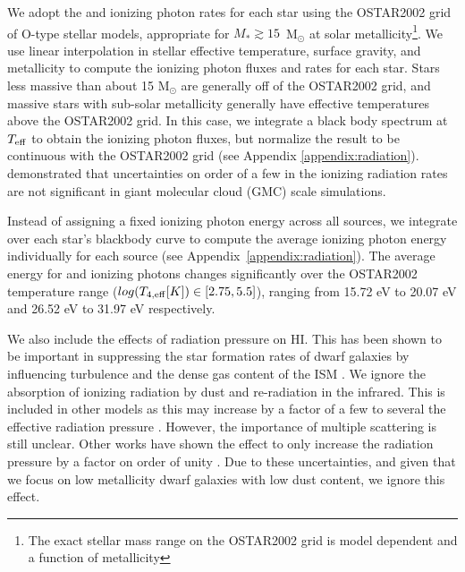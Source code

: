 \documentclass[twocolumn]{aastex61}
\begin{document}
We adopt the  and  ionizing photon rates for each star using the OSTAR2002 \citep{Lanz2003} grid of O-type stellar models, appropriate for $M_{*} \gtrsim 15$~M$_{\odot}$ at solar metallicity\footnote{The exact stellar mass range on the OSTAR2002 grid is model dependent and a function of metallicity}. We use linear interpolation in stellar effective temperature, surface gravity, and metallicity to compute the ionizing photon fluxes and rates for each star. Stars less massive than about 15 M$_{\odot}$ are generally off of the OSTAR2002 grid, and massive stars with sub-solar metallicity generally have effective temperatures above the OSTAR2002 grid. In this case, we integrate a black body spectrum at $T_{\rm eff}$ to obtain the ionizing photon fluxes, but normalize the result to be continuous with the OSTAR2002 grid (see Appendix \ref{appendix:radiation}). \citep{Dale2012} demonstrated that uncertainties on order of a few in the ionizing radiation rates are not significant in giant molecular cloud (GMC) scale simulations.

Instead of assigning a fixed ionizing photon energy across all sources, we integrate over each star's blackbody curve to compute the average ionizing photon energy individually for each source (see Appendix~\ref{appendix:radiation}). The average energy for  and  ionizing photons changes significantly over the OSTAR2002 temperature range ($log(T_{4,\rm{eff}} [K]) \in \left[2.75,5.5\right]$), ranging from 15.72 eV to 20.07 eV and 26.52 eV to 31.97 eV respectively.

We also include the effects of radiation pressure on HI. This has been shown to be important in suppressing the star formation rates of dwarf galaxies by influencing turbulence and the dense gas content of the ISM \citep{WiseAbel2012,Ceverino2014}. We ignore the absorption of ionizing radiation by dust and re-radiation in the infrared. This is included in other models \citep[e.g.][]{Rosdahl2015,FIRE,FIRE2} as this may increase by a factor of a few to several the effective radiation pressure \citep{ZhangDavis2017}. However, the importance of multiple scattering is still unclear. Other works have shown the effect to only increase the radiation pressure by a factor on order of unity \citep{Krumholz2012,Krumholz2013}. Due to these uncertainties, and given that we focus on low metallicity dwarf galaxies with low dust content, we ignore this effect.
\end{document}
